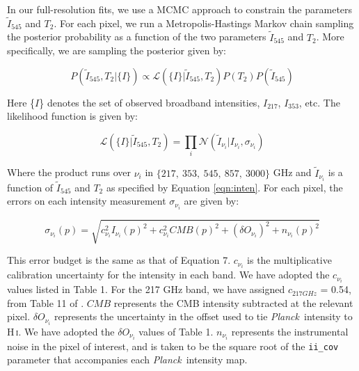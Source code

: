 \documentclass{emulateapj}
\newcommand{\PLANCK}{{\it Planck}}
\begin{document}
In our full-resolution fits, we use a MCMC approach to constrain the 
parameters $\tilde{I}_{545}$ and $T_2$. For each pixel, we run a 
Metropolis-Hastings Markov chain sampling the posterior probability as a 
function of the two parameters $\tilde{I}_{545}$ and $T_2$. More specifically, 
we are sampling the posterior given by:


\begin{equation}
\label{eqn:post}
P(\tilde{I}_{545}, T_2|\{I\}) \propto \mathcal{L}(\{I\}|\tilde{I}_{545}, T_2)P(T_2)P(\tilde{I}_{545})
\end{equation}


Here \{$I$\} denotes the set of observed broadband intensities, $I_{217}$, 
$I_{353}$, etc. The likelihood function is given by:

\begin{equation} \label{equ:like}
\mathcal{L}(\{I\}|\tilde{I}_{545}, T_2) = \displaystyle\prod\limits_{i}\mathcal{N}(\tilde{I}_{\nu_{i}}|I_{\nu_{i}}, \sigma_{\nu_i})
\end{equation}


Where the product runs over $\nu_i$ in $\{217,\ 353,\ 545,\ 857,\ 3000\}$ GHz
and $\tilde{I}_{\nu_i}$ is a function of $\tilde{I}_{545}$ and $T_2$ as 
specified by Equation \ref{eqn:inten}. For each pixel, the errors on each 
intensity measurement $\sigma_{\nu_i}$ are given by:

\begin{equation}
\sigma_{\nu_i}(p) = \sqrt{c^2_{\nu_i}I_{\nu_i}(p)^2 + c^2_{\nu_i}CMB(p)^2 + (\delta O_{\nu_i})^2 + n_{\nu_i}(p)^2}
\end{equation}


This error budget is the same as that of \cite{planckdust} Equation 7. 
$c_{\nu_i}$ is the multiplicative calibration uncertainty for the intensity in 
each band. We have adopted the $c_{\nu_i}$ values listed in \cite{planckdust} 
Table 1. For the 217 GHz band, we have assigned $c_{217 GHz}$ = 0.54, from 
Table 11 of \cite{planckcalib}. $CMB$ represents the CMB intensity 
subtracted at the relevant pixel. $\delta O_{\nu_i}$ represents the uncertainty
in the offset used to tie \PLANCK~intensity to H\,\textsc{i}. We have adopted 
the  $\delta O_{\nu_i}$ values of \cite{planckdust} Table 1. $n_{\nu_i}$ 
represents the instrumental noise in the pixel of interest, and is taken to be 
the square root of the \verb|ii_cov| parameter that accompanies each 
\PLANCK~intensity map.
\end{document}
